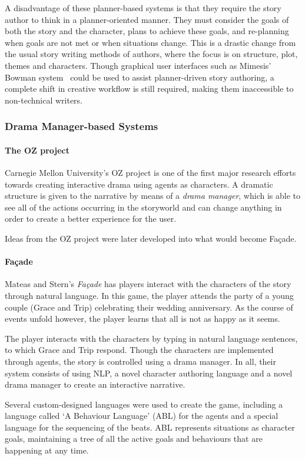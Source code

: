 A disadvantage of these planner-based systems is that they require the story author to think in a planner-oriented manner. They must consider the goals of both the story and the character, plans to achieve these goals, and re-planning when goals are not met or when situations change. This is a drastic change from the usual story writing methods of authors, where the focus is on structure, plot, themes and characters. Though graphical user interfaces such as Mimesis' Bowman system~\cite{thomas2006author} could be used to assist planner-driven story authoring, a complete shift in creative workflow is still required, making them inaccessible to non-technical writers.

\subsubsection{Drama Manager-based Systems}
\paragraph{The OZ project}
Carnegie Mellon University's OZ project \citep{mateas1999oz} is one of the first major research efforts towards creating interactive drama using agents as characters. A dramatic structure is given to the narrative by means of a \emph{drama manager}, which is able to see all of the actions occurring in the storyworld and can change anything in order to create a better experience for the user.

Ideas from the OZ project were later developed into what would become Fa\c{c}ade.
\paragraph{Fa\c{c}ade}
Mateas and Stern's \emph{Fa\c{c}ade} has players interact with the characters of the story through natural language. In this game, the player attends the party of a young couple (Grace and Trip) celebrating their wedding anniversary. As the course of events unfold however, the player learns that all is not as happy as it seems.

The player interacts with the characters by typing in natural language sentences, to which Grace and Trip respond. Though the characters are implemented through agents, the story is controlled using a drama manager. In all, their system consists of using NLP, a novel character authoring language and a novel drama manager to create an interactive narrative.

Several custom-designed languages were used to create the game, including a language called `A Behaviour Language' (ABL) for the agents and a special language for the sequencing of the beats. ABL represents situations as character goals, maintaining a tree of all the active goals and behaviours that are happening at any time.

